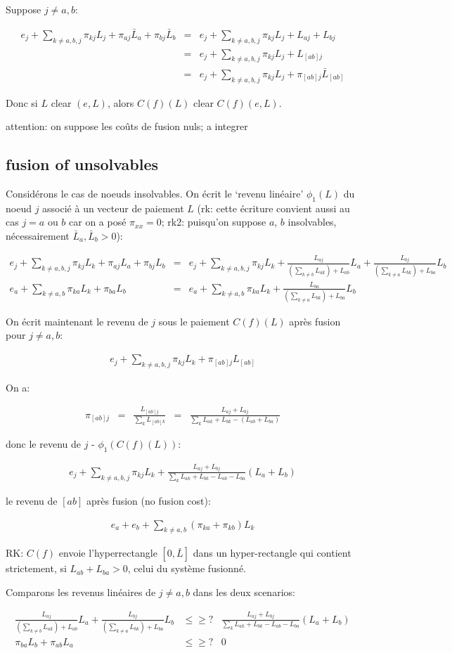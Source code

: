 \documentclass{article}
\def\AR#1{
\[
\begin{array}{llllllll}
#1
\end{array}
\]
}
\begin{document}
Suppose $j\neq a, b$:
\AR{
e_j +
\sum_{k\neq a,b,j} 
\pi_{kj} L_j
+
\pi_{aj} \bar L_a
+
\pi_{bj} \bar L_b
&=&
e_j +
\sum_{k\neq a,b,j} 
\pi_{kj} L_j
+
L_{aj} +
L_{bj} 
\\
&=&
e_j +
\sum_{k\neq a,b,j} 
\pi_{kj} L_j
+
L_{[ab]j}
\\
&=&
e_j +
\sum_{k\neq a,b,j} 
\pi_{kj} L_j
+
\pi_{[ab]j} \bar L_{[ab]}
}


Donc si $L$ clear $(e,L)$,
alors $C(f)(L)$ clear 
$C(f)(e,L)$.

attention: on suppose les co\^uts de fusion nuls; a integrer

\subsection{fusion of unsolvables} 
Considérons le cas de noeuds insolvables.
On écrit le `revenu linéaire' $\phi_1(L)$ du noeud $j$ associé à un vecteur de paiement $L$ (rk: cette écriture convient aussi au cas $j=a$ ou $b$ car on a posé $\pi_{xx}=0$; rk2: puisqu'on suppose  $a$, $b$ insolvables, nécessairement $\bar L_a,\bar L_b>0$):
\AR{
e_j +
\sum_{k\neq a,b,j} 
\pi_{kj} L_k
+
\pi_{aj} L_a
+
\pi_{bj} L_b
&=&
e_j +
\sum_{k\neq a,b,j} 
\pi_{kj} L_k
+
\frac{L_{aj}}{
(\sum_{k\neq b} L_{ak})
+ L_{ab}
} L_a
+
\frac{L_{bj}}{
(\sum_{k\neq a} L_{bk})
+ L_{ba}
} 
L_b
\\
e_a +
\sum_{k\neq a,b} 
\pi_{ka} L_k
+
\pi_{ba} L_b
&=&
e_a +
\sum_{k\neq a,b} 
\pi_{ka} L_k
+
\frac{L_{ba}}{
(\sum_{k\neq a} L_{bk})
+ L_{ba}
} 
L_b
}
On écrit maintenant le revenu de $j$
sous le paiement $C(f)(L)$ après fusion pour $j\neq a,b$:
\AR{
e_j +
\sum_{k\neq a,b,j} 
\pi_{kj} L_k
+
\pi_{[ab]j} L_{[ab]}
}

On a:
\AR{
\pi_{[ab]j} &=&
\frac
{L_{[ab]j}}
{\sum_k L_{[ab]k}}
&=&
\frac
{L_{aj}+L_{bj}}
{
\sum_k L_{ak} + L_{bk} -
(L_{ab}+L_{ba})
}
}
donc le revenu de $j$ -
$\phi_1(C(f)(L))$:
\AR{
e_j +
\sum_{k\neq a,b,j} 
\pi_{kj} L_k
+
\frac
{L_{aj}+L_{bj}}
{
\sum_k L_{ak} + L_{bk} -
L_{ab}- L_{ba}
}
(L_a+L_b)
}

le revenu de $[ab]$ après fusion (no fusion cost):
\AR{
e_a + e_b + 
\sum_{k\neq a,b} 
(\pi_{ka}+\pi_{kb}) L_k
}

RK: $C(f)$ envoie l'hyperrectangle $[0,\bar L]$
dans un hyper-rectangle qui 
contient strictement, si
$L_{ab}+L_{ba}>0$, celui du système fusionné.

Comparons les revenus linéaires de $j\neq a,b$ dans les deux scenarios:

\AR{
\frac{L_{aj}}{
(\sum_{k\neq b} L_{ak})
+ L_{ab}
} L_a
+
\frac{L_{bj}}{
(\sum_{k\neq a} L_{bk})
+ L_{ba}
} 
L_b
&\leq\geq?&
\frac
{L_{aj}+L_{bj}}
{
\sum_k L_{ak} + L_{bk} -
L_{ab}- L_{ba}
}
(L_a+L_b)
\\
\pi_{ba} L_b +
\pi_{ab} L_a
&\leq\geq?&
0
}
\end{document}
